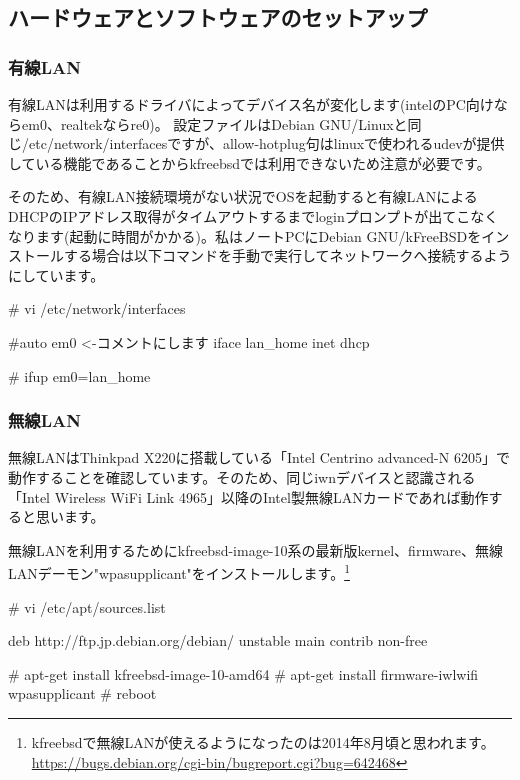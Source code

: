 \documentclass[mingoth,a4paper]{jsarticle}
\begin{document}
\subsection{ハードウェアとソフトウェアのセットアップ}
\subsubsection{有線LAN}

有線LANは利用するドライバによってデバイス名が変化します(intelのPC向けならem0、realtekならre0)。
設定ファイルはDebian GNU/Linuxと同じ/etc/network/interfacesですが、allow-hotplug句はlinuxで使われるudevが提供している機能であることからkfreebsdでは利用できないため注意が必要です。

そのため、有線LAN接続環境がない状況でOSを起動すると有線LANによるDHCPのIPアドレス取得がタイムアウトするまでloginプロンプトが出てこなくなります(起動に時間がかかる)。私はノートPCにDebian GNU/kFreeBSDをインストールする場合は以下コマンドを手動で実行してネットワークへ接続するようにしています。

\begin{commandline}
  # vi /etc/network/interfaces

  #auto em0  <-コメントにします
  iface lan_home inet dhcp

  
  # ifup em0=lan_home
\end{commandline}

\subsubsection{無線LAN}

無線LANはThinkpad X220に搭載している「Intel Centrino advanced-N 6205」で動作することを確認しています。そのため、同じiwnデバイスと認識される「Intel Wireless WiFi Link 4965」以降のIntel製無線LANカードであれば動作すると思います。

無線LANを利用するためにkfreebsd-image-10系の最新版kernel、firmware、無線LANデーモン"wpasupplicant"をインストールします。\footnote{kfreebsdで無線LANが使えるようになったのは2014年8月頃と思われます。 \url{https://bugs.debian.org/cgi-bin/bugreport.cgi?bug=642468}}

\begin{commandline}
  # vi /etc/apt/sources.list

  deb http://ftp.jp.debian.org/debian/ unstable main contrib non-free

  # apt-get install kfreebsd-image-10-amd64
  # apt-get install firmware-iwlwifi wpasupplicant
  # reboot
\end{commandline}
\end{document}
